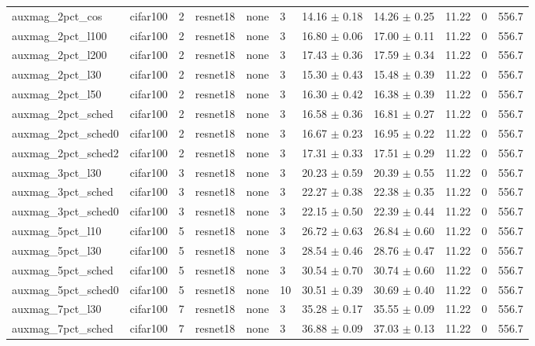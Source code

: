 \begin{tabular}{lllllllllll}
auxmag_2pct_cos & cifar100 & 2 & resnet18 & none & 3 & 14.16 $\pm$ 0.18 & 14.26 $\pm$ 0.25 & 11.22 & 0 & 556.7 \\
auxmag_2pct_l100 & cifar100 & 2 & resnet18 & none & 3 & 16.80 $\pm$ 0.06 & 17.00 $\pm$ 0.11 & 11.22 & 0 & 556.7 \\
auxmag_2pct_l200 & cifar100 & 2 & resnet18 & none & 3 & 17.43 $\pm$ 0.36 & 17.59 $\pm$ 0.34 & 11.22 & 0 & 556.7 \\
auxmag_2pct_l30 & cifar100 & 2 & resnet18 & none & 3 & 15.30 $\pm$ 0.43 & 15.48 $\pm$ 0.39 & 11.22 & 0 & 556.7 \\
auxmag_2pct_l50 & cifar100 & 2 & resnet18 & none & 3 & 16.30 $\pm$ 0.42 & 16.38 $\pm$ 0.39 & 11.22 & 0 & 556.7 \\
auxmag_2pct_sched & cifar100 & 2 & resnet18 & none & 3 & 16.58 $\pm$ 0.36 & 16.81 $\pm$ 0.27 & 11.22 & 0 & 556.7 \\
auxmag_2pct_sched0 & cifar100 & 2 & resnet18 & none & 3 & 16.67 $\pm$ 0.23 & 16.95 $\pm$ 0.22 & 11.22 & 0 & 556.7 \\
auxmag_2pct_sched2 & cifar100 & 2 & resnet18 & none & 3 & 17.31 $\pm$ 0.33 & 17.51 $\pm$ 0.29 & 11.22 & 0 & 556.7 \\
auxmag_3pct_l30 & cifar100 & 3 & resnet18 & none & 3 & 20.23 $\pm$ 0.59 & 20.39 $\pm$ 0.55 & 11.22 & 0 & 556.7 \\
auxmag_3pct_sched & cifar100 & 3 & resnet18 & none & 3 & 22.27 $\pm$ 0.38 & 22.38 $\pm$ 0.35 & 11.22 & 0 & 556.7 \\
auxmag_3pct_sched0 & cifar100 & 3 & resnet18 & none & 3 & 22.15 $\pm$ 0.50 & 22.39 $\pm$ 0.44 & 11.22 & 0 & 556.7 \\
auxmag_5pct_l10 & cifar100 & 5 & resnet18 & none & 3 & 26.72 $\pm$ 0.63 & 26.84 $\pm$ 0.60 & 11.22 & 0 & 556.7 \\
auxmag_5pct_l30 & cifar100 & 5 & resnet18 & none & 3 & 28.54 $\pm$ 0.46 & 28.76 $\pm$ 0.47 & 11.22 & 0 & 556.7 \\
auxmag_5pct_sched & cifar100 & 5 & resnet18 & none & 3 & 30.54 $\pm$ 0.70 & 30.74 $\pm$ 0.60 & 11.22 & 0 & 556.7 \\
auxmag_5pct_sched0 & cifar100 & 5 & resnet18 & none & 10 & 30.51 $\pm$ 0.39 & 30.69 $\pm$ 0.40 & 11.22 & 0 & 556.7 \\
auxmag_7pct_l30 & cifar100 & 7 & resnet18 & none & 3 & 35.28 $\pm$ 0.17 & 35.55 $\pm$ 0.09 & 11.22 & 0 & 556.7 \\
auxmag_7pct_sched & cifar100 & 7 & resnet18 & none & 3 & 36.88 $\pm$ 0.09 & 37.03 $\pm$ 0.13 & 11.22 & 0 & 556.7 \\

\end{tabular}
